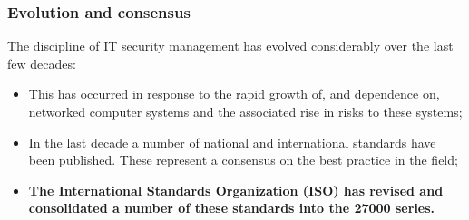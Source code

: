 \documentclass[xcolor ={table,usenames,dvipsnames}]{beamer}
\theoremstyle{definition}
\begin{document}
	\begin{frame}
		\frametitle{Evolution and consensus}
		The discipline of IT security management has evolved considerably over the last few decades:
		 
		\begin{itemize}
			\item This has occurred in response to the rapid growth of, and dependence on, networked computer systems and the associated rise in risks to these systems;
			\item In the last	decade a number of national and international standards have been published. These represent a consensus on the best practice in the field;
			\item \textbf{The International Standards Organization (ISO) has revised and consolidated a number of these standards into the 27000 series.}
		\end{itemize}
		 
	\end{frame}
\end{document}
